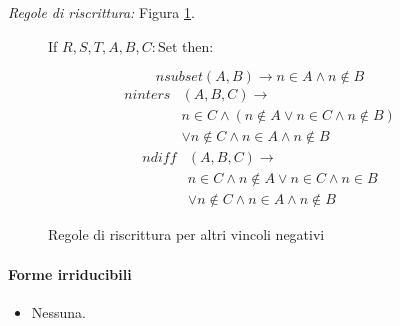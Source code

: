 \documentclass[12pt,a4paper,openright]{book}  %
\begin{document}
\noindent\textit{Regole di riscrittura:} Figura \ref{fig:othernegatives_constraints}.

\begin{figure}
	\begin{tcolorbox}[colframe=black, colback=white, sharp corners]
		\setcounter{equation}{0}
		\renewcommand{\theequation}{\arabic{equation}}

		If $R, S, T, A, B, C: \text{Set}$ then:

		\begin{equation}
		nsubset(A,B) \to n \in A \land n \not\in B
		\end{equation}
		\begin{equation}
		\begin{split}
		ninters& (A,B,C) \to \\
		  & n \in C \land ( n \not\in A \lor n \in C \land n \not\in B ) \\
		  & \lor n \not\in C \land n \in A \land n \not\in B
		\end{split}
		\end{equation}
		\begin{equation}
		\begin{split}
		ndiff& (A,B,C) \to \\
		  & n \in C \land n \not\in A \lor n \in C \land n \in B \\
		  & \lor n \not\in C \land n \in A \land n \not\in B
		\end{split}
		\end{equation}

	\end{tcolorbox}

	\caption{Regole di riscrittura per altri vincoli negativi}
	\label{fig:othernegatives_constraints}
\end{figure}

\paragraph{Forme irriducibili}
\begin{itemize}
	\item Nessuna.
\end{itemize}

\end{document}
